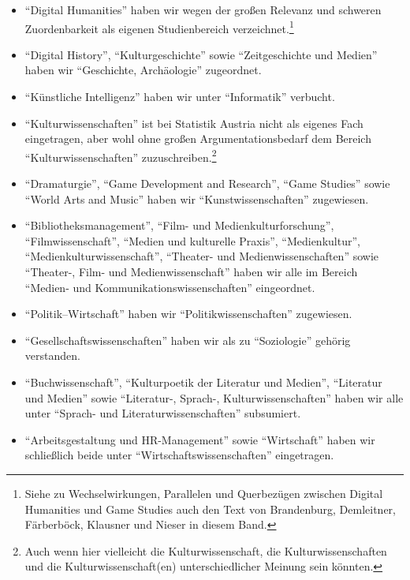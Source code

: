 \documentclass{scrartcl}
\begin{document}
\begin{itemize}
   \item \enquote{Digital Humanities} haben wir wegen der großen Relevanz und schweren Zuordenbarkeit als eigenen Studienbereich verzeichnet.\footnote{Siehe zu Wechselwirkungen, Parallelen und Querbezügen zwischen Digital Humanities und Game Studies auch den Text von Brandenburg, Demleitner, Färberböck, Klausner und Nieser in diesem Band.}
   \item \enquote{Digital History}, \enquote{Kulturgeschichte} sowie \enquote{Zeitgeschichte und Medien} haben wir \enquote{Geschichte, Archäologie} zugeordnet.
   \item \enquote{Künstliche Intelligenz} haben wir unter \enquote{Informatik} verbucht.
   \item \enquote{Kulturwissenschaften} ist bei Statistik Austria nicht als eigenes Fach eingetragen, aber wohl ohne großen Argumentationsbedarf dem Bereich \enquote{Kulturwissenschaften} zuzuschreiben.\footnote{Auch wenn hier vielleicht die Kulturwissenschaft, die Kulturwissenschaften und die Kulturwissenschaft(en) unterschiedlicher Meinung sein könnten.}
   \item \enquote{Dramaturgie}, \enquote{Game Development and Research}, \enquote{Game Studies} sowie \enquote{World Arts and Music} haben wir \enquote{Kunstwissenschaften} zugewiesen.
   \item \enquote{Bibliotheksmanagement}, \enquote{Film- und Medienkulturforschung}, \enquote{Filmwissenschaft}, \enquote{Medien und kulturelle Praxis}, \enquote{Medienkultur}, \enquote{Medienkulturwissenschaft}, \enquote{Theater- und Medienwissenschaften} sowie \enquote{Theater-, Film- und Medienwissenschaft} haben wir alle im Bereich \enquote{Medien- und Kommunikationswissenschaften} eingeordnet.
   \item \enquote{Politik–Wirtschaft} haben wir \enquote{Politikwissenschaften} zugewiesen.
   \item \enquote{Gesellschaftswissenschaften} haben wir als zu \enquote{Soziologie} gehörig verstanden.
   \item \enquote{Buchwissenschaft}, \enquote{Kulturpoetik der Literatur und Medien}, \enquote{Literatur und Medien} sowie \enquote{Literatur-, Sprach-, Kulturwissenschaften} haben wir alle unter \enquote{Sprach- und Literaturwissenschaften} subsumiert.
   \item \enquote{Arbeitsgestaltung und HR-Management} sowie \enquote{Wirtschaft} haben wir schließlich beide unter \enquote{Wirtschaftswissenschaften} eingetragen.
\end{itemize}
\end{document}
